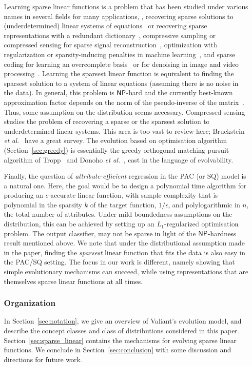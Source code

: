 Learning sparse linear functions is a problem that has been studied under
various names in several fields for many applications, \eg, recovering sparse
solutions to (underdetermined) linear systems of
equations~\cite{Donoho:2009-sparse} or recovering sparse representations with a
redundant dictionary~\cite{Mallat:2008,Elad:2010}, compressive sampling or
compressed sensing for sparse signal reconstruction~\cite{Candes:2008},
optimization with regularization or sparsity-inducing penalties in machine
learning~\cite{Bach:2012}, and sparse coding for learning an overcomplete
basis~\cite{Olshausen:1997} or for denoising in image and video
processing~\cite{Elad:2010}. Learning the sparsest linear function is equivalent
to finding the sparsest solution to a system of linear equations (assuming there
is no noise in the data). In general, this problem is $\mathsf{NP}$-hard and the
currently best-known approximation factor depends on the norm of the
pseudo-inverse of the matrix~\cite{Natarajan:1995}. Thus, some assumption on the
distribution seems necessary. Compressed sensing studies the problem of
recovering a sparse or the sparsest solution to underdetermined linear systems.
This area is too vast to review here; Bruckstein \emph{et
al.}~\cite{Donoho:2009-sparse} have a great survey. The evolution based on
optimisation algorithm (Section~\ref{sec:greedy}) is essentially the greedy
orthogonal matching pursuit algorithm of Tropp~\cite{Tropp:2004-greed} and
Donoho \emph{et al.}~\cite{Donoho:2006-recovery}, cast in the language of
evolvability. 

Finally, the question of \emph{attribute-efficient} regression in the PAC (or
SQ) model is a natural one. Here, the goal would be to design a polynomial time
algorithm for producing an $\epsilon$-accurate linear function, with sample
complexity that is polynomial in the sparsity $k$ of the target function,
$1/\epsilon$, and polylogarithmic in $n$, the total number of attributes. Under
mild boundedness assumptions on the distribution, this can be achieved by
setting up an $L_1$-regularized optimisation problem. The output classifier, may
not be sparse in light of the $\mathsf{NP}$-hardness result mentioned above. We note
that under the distributional assumption made in the paper, finding the
\emph{sparsest} linear function that fits the data is also easy in the PAC/SQ
setting.  The focus in our work is different, namely showing that simple
evolutionary mechanisms can succeed, while using representations that are
themselves sparse linear functions at all times.

\subsubsection*{Organization}

In Section~\ref{sec:notation}, we give an overview of Valiant's evolution model,
and describe the concept classes and class of distributions considered in this
paper.  Section~\ref{sec:sparse_linear} contains the mechanisms for evolving
sparse linear functions. We conclude in Section~\ref{sec:conclusion} with some
discussion and directions for future work.
